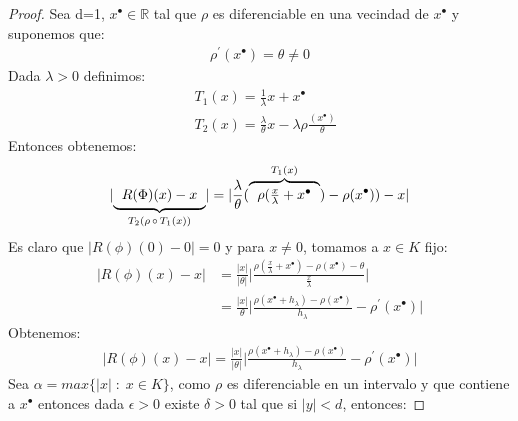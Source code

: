 \documentclass[12pt,a4paper]{book}
\providecommand{\der}[1]{#1^{\prime}}
\providecommand{\abs}[1]{\lvert#1\rvert}
\providecommand{\mx}[1]{max\lbrace#1\rbrace}
\begin{document}
\smallskip
\begin{proof}
Sea d=1, $x^{\bullet}\in\mathbb{R}$ tal que $\rho$ es diferenciable en una vecindad de $x^{\bullet}$ y suponemos que:
\begin{equation*}
\begin{split}
\rho^{\prime}(x^{\bullet})=\theta\neq 0
\end{split}
\end{equation*}
Dada $\lambda >0$ definimos:
\begin{equation*}
\begin{split}
&T_{1}(x) =\frac{1}{\lambda}x+x^{\bullet}\\&
T_{2}(x) =\frac{\lambda}{\theta}x-\lambda\rho\frac{( x^{\bullet})}{\theta}
\end{split}
\end{equation*}
Entonces obtenemos:
\begin{equation*}
\begin{split}
\abs{
\underbrace{
\begin{tabular}{c}
$R(\Phi)(x)-x$\\
\end{tabular}
}_{T_{2}(\rho\,\circ\, T_{1}(x))}}=\abs{\frac{\lambda}{\theta}
(\overbrace{
\begin{tabular}{c}
$\rho(\frac{x}{\lambda}
+x^{\bullet}$\\
\end{tabular}}^{T_{1}(x)}
)-\rho(x^{\bullet}))-x}
\end{split}
\end{equation*} 
Es claro que $\abs{R(\phi)(0)-0}=0$ y para $x\neq 0$, tomamos a $x\in K$ fijo:
\begin{equation*}
\begin{split}
\abs{R(\phi)(x)-x}&=\frac{\abs{x}}{\abs{\theta}}\abs{\frac{\rho(\frac{x}{\lambda}+x^{\bullet})-\rho(x^{\bullet})-\theta}{\frac{x}{\lambda}}}\\&
=\frac{\abs{x}}{\theta}\abs{\frac{\rho(x^{\bullet}+h_{\lambda})-\rho(x^{\bullet})}{h_{\lambda}}-\rho^{\prime}(x^{\bullet})}
\end{split}
\end{equation*}
Obtenemos:
\begin{equation*}
\begin{split}
\abs{R(\phi)(x)-x}=\frac{\abs{x}}{\abs{\theta}}\abs{\frac{\rho(x^{\bullet}+h_{\lambda})-\rho(x^{\bullet})}{h_{\lambda}}-\der{\rho}(x^{\bullet})}
\end{split}
\end{equation*}
Sea $\alpha=\mx{\abs{x}\;:\;x\in K}$, como $\rho$ es diferenciable en un intervalo y que contiene a $x^{\bullet}$ entonces dada $\epsilon >0$ existe $\delta >0$ tal que si $\abs{y}<d$, entonces:

\end{proof}
\end{document}
